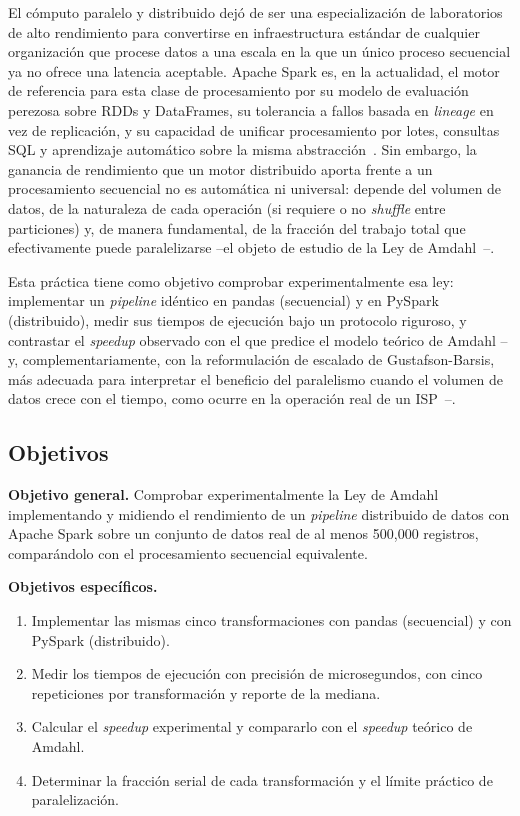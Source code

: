 \documentclass[11pt,a4paper]{article}
\begin{document}
El cómputo paralelo y distribuido dejó de ser una especialización de laboratorios de alto
rendimiento para convertirse en infraestructura estándar de cualquier organización que procese
datos a una escala en la que un único proceso secuencial ya no ofrece una latencia aceptable.
Apache Spark es, en la actualidad, el motor de referencia para esta clase de procesamiento por
su modelo de evaluación perezosa sobre RDDs y DataFrames, su tolerancia a fallos basada en
\emph{lineage} en vez de replicación, y su capacidad de unificar procesamiento por lotes,
consultas SQL y aprendizaje automático sobre la misma
abstracción~\autocite{zaharia2012,armbrust2015,tang2020}. Sin embargo, la ganancia de rendimiento
que un motor distribuido aporta frente a un procesamiento secuencial no es automática ni
universal: depende del volumen de datos, de la naturaleza de cada operación (si requiere o no
\emph{shuffle} entre particiones) y, de manera fundamental, de la fracción del trabajo total que
efectivamente puede paralelizarse --el objeto de estudio de la Ley de
Amdahl~\autocite{amdahl1967}--.

Esta práctica tiene como objetivo comprobar experimentalmente esa ley: implementar un
\emph{pipeline} idéntico en pandas (secuencial) y en PySpark (distribuido), medir sus tiempos de
ejecución bajo un protocolo riguroso, y contrastar el \emph{speedup} observado con el que predice
el modelo teórico de Amdahl --y, complementariamente, con la reformulación de escalado de
Gustafson-Barsis, más adecuada para interpretar el beneficio del paralelismo cuando el volumen de
datos crece con el tiempo, como ocurre en la operación real de un
ISP~\autocite{gustafson1988}--.

    \subsection{Objetivos}
    \label{sec:objetivos}

    \textbf{Objetivo general.} Comprobar experimentalmente la Ley de Amdahl implementando y
    midiendo el rendimiento de un \emph{pipeline} distribuido de datos con Apache Spark sobre un
    conjunto de datos real de al menos 500{,}000 registros, comparándolo con el procesamiento
    secuencial equivalente.

    \textbf{Objetivos específicos.}
    \begin{enumerate}[leftmargin=1.5em]
    \item Implementar las mismas cinco transformaciones con pandas (secuencial) y con PySpark
    (distribuido).
    \item Medir los tiempos de ejecución con precisión de microsegundos, con cinco repeticiones
    por transformación y reporte de la mediana.
    \item Calcular el \emph{speedup} experimental y compararlo con el \emph{speedup} teórico de
    Amdahl.
    \item Determinar la fracción serial de cada transformación y el límite práctico de
    paralelización.
    \end{enumerate}
\end{document}
